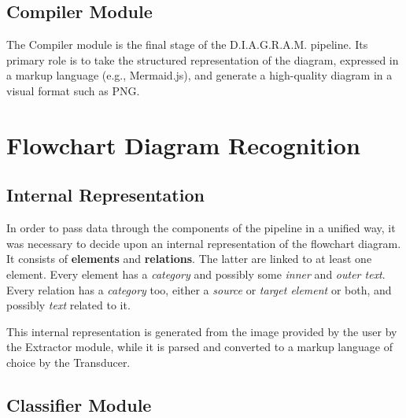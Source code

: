 \documentclass[conference]{IEEEtran}
\begin{document}
\subsection{Compiler Module}
The Compiler module is the final stage of the D.I.A.G.R.A.M. pipeline. 
Its primary role is to take the structured representation of the diagram, expressed in a markup language (e.g., Mermaid.js), and generate a high-quality diagram in a visual format such as PNG. 

% 
%
\section{Flowchart Diagram Recognition}

\subsection{Internal Representation}
In order to pass data through the components of the pipeline in a unified way, it was necessary to decide upon an internal representation of the flowchart diagram. It consists of \textbf{elements} and \textbf{relations}. The latter are linked to at least one element. Every element has a \textit{category} and possibly some \textit{inner} and \textit{outer text}. Every relation has a \textit{category} too, either a \textit{source} or \textit{target element} or both, and possibly \textit{text} related to it.

This internal representation is generated from the image provided by the user by the Extractor module, while it is parsed and converted to a markup language of choice by the Transducer. 

\subsection{Classifier Module}
\end{document}
